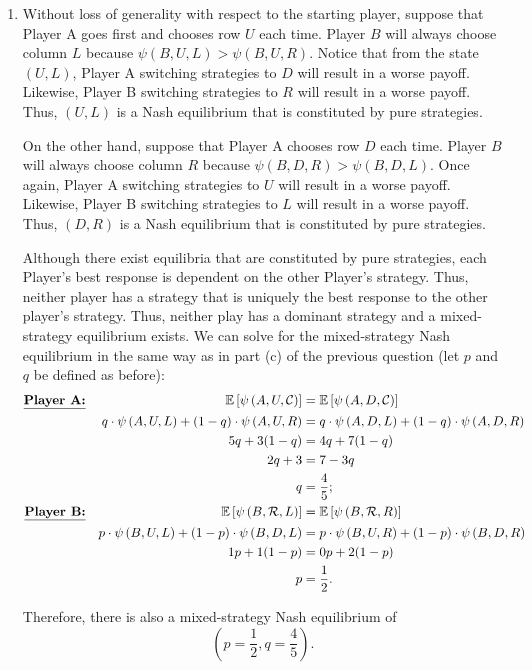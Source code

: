 \documentclass{article}
\newcommand{\pay}[3]{\psi\left(#1,#2,#3\right)}
\newcommand{\expp}[1]{\mathbb{E}\left[ #1 \right]}
\begin{document}
\begin{enumerate}
    \item Without loss of generality with respect to the starting player, suppose that Player A goes first and chooses row $U$ each time. Player $B$ will always choose column $L$ because $\pay{B}{U}{L}>\pay{B}{U}{R}$. Notice that from the state $(U,L)$, Player A switching strategies to $D$ will result in a worse payoff. Likewise, Player B switching strategies to $R$ will result in a worse payoff. Thus, $(U,L)$ is a Nash equilibrium that is constituted by pure strategies.
    
    On the other hand, suppose that Player A chooses row $D$ each time. Player $B$ will always choose column $R$ because $\pay{B}{D}{R}>\pay{B}{D}{L}$. Once again, Player A switching strategies to $U$ will result in a worse payoff. Likewise, Player B switching strategies to $L$ will result in a worse payoff. Thus, $(D,R)$ is a Nash equilibrium that is constituted by pure strategies.

    Although there exist equilibria that are constituted by pure strategies, each Player's best response is dependent on the other Player's strategy. Thus, neither player has a strategy that is uniquely the best response to the other player's strategy. Thus, neither play has a dominant strategy and a mixed-strategy equilibrium exists. We can solve for the mixed-strategy Nash equilibrium in the same way as in part (c) of the previous question (let $p$ and $q$ be defined as before):
    \begin{align*}
        \textbf{\underline{Player A:}} && \expp{\pay{A}{U}{\mathcal{C}}} & =\expp{\pay{A}{D}{\mathcal{C}}} \\
        && q\cdot\pay{A}{U}{L} + (1-q)\cdot\pay{A}{U}{R} & =q\cdot\pay{A}{D}{L} + (1-q)\cdot\pay{A}{D}{R} \\
        && 5q + 3(1-q) & =4q + 7(1-q) \\
        && 2q+3 & =7-3q \\
        && q & =\frac{4}{5}; \\
        \textbf{\underline{Player B:}} && \expp{\pay{B}{\mathcal{R}}{L}} & =\expp{\pay{B}{\mathcal{R}}{R}} \\
        && p\cdot\pay{B}{U}{L} + (1-p)\cdot\pay{B}{D}{L} & =p\cdot\pay{B}{U}{R} + (1-p)\cdot\pay{B}{D}{R} \\
        && 1p+1(1-p) & =0p+2(1-p) \\
        && p & =\frac{1}{2}.
    \end{align*}

    Therefore, there is also a mixed-strategy Nash equilibrium of 
    $$(p=\frac{1}{2},q=\frac{4}{5}).$$


\end{enumerate}
\end{document}
